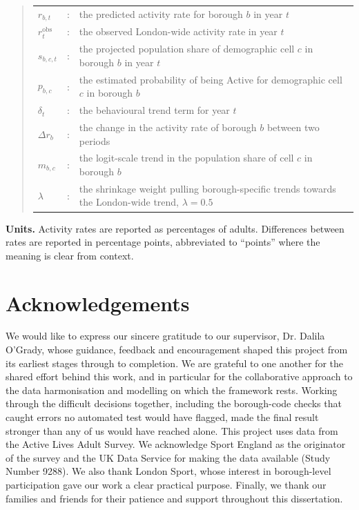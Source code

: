 \documentclass[ %
                    author={Ashrey Ashrey, Sanya Kapoor, Trisha Sharma, Yash Bhooshan Pandloskar},
                supervisor={Dr. Dalila O’Grady},
                    degree={MSc},
                     title={Using machine learning to forecast physical activity participation, volunteering and activity patterns in London},
                  subtitle={},
                      type={},
                      year={2021}]{dissertation}
\begin{document}
\begin{quote}
\begin{tabular}{l c >{\raggedright\arraybackslash}p{}}
$r_{b,t}$   & : & the predicted activity rate for borough $b$ in year $t$ \\
$r_t^{\mathrm{obs}}$ & : & the observed London-wide activity rate in year $t$ \\
$s_{b,c,t}$ & : & the projected population share of demographic cell $c$ in borough $b$ in year $t$ \\
$p_{b,c}$   & : & the estimated probability of being Active for demographic cell $c$ in borough $b$ \\
$\delta_t$  & : & the behavioural trend term for year $t$ \\
$\Delta r_b$& : & the change in the activity rate of borough $b$ between two periods \\
$m_{b,c}$   & : & the logit-scale trend in the population share of cell $c$ in borough $b$ \\
$\lambda$   & : & the shrinkage weight pulling borough-specific trends towards the London-wide trend, $\lambda = 0.5$ \\
\end{tabular}
\end{quote}

\noindent
\textbf{Units.} Activity rates are reported as percentages of adults. Differences
between rates are reported in percentage points, abbreviated to ``points'' where
the meaning is clear from context.


\chapter*{Acknowledgements}

We would like to express our sincere gratitude to our supervisor, Dr. Dalila O’Grady, whose guidance, feedback and encouragement shaped this project from its earliest stages through to completion.
We are grateful to one another for the shared effort behind this work, and in particular for the collaborative approach to the data harmonisation and modelling on which the framework rests. Working through the difficult decisions together, including the borough-code checks that caught errors no automated test would have flagged, made the final result stronger than any of us would have reached alone.
This project uses data from the Active Lives Adult Survey. We acknowledge Sport England as the originator of the survey and the UK Data Service for making the data available (Study Number 9288). We also thank London Sport, whose interest in borough-level participation gave our work a clear practical purpose.
Finally, we thank our families and friends for their patience and support throughout this dissertation.
\end{document}
